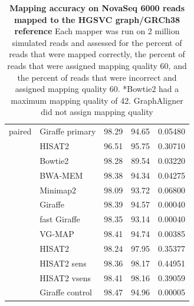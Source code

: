 \documentclass[11pt]{ucscthesis}
\begin{document}
\begin{table}[H]
\begin{tabular}{|l|l|r|r|r|}
        \hline
        paired  & Giraffe primary	& 98.29     & 94.65     & 0.05480 \\
                & HISAT2	        & 96.51     & 95.75     & 0.30710 \\
                & Bowtie2       	& 98.28     & 89.54     & 0.03220 \\
                & BWA-MEM       	& 98.38     & 94.34     & 0.04275 \\
                & Minimap2      	& 98.09     & 93.72     & 0.06800 \\
                & Giraffe       	& 98.39     & 94.57     & 0.00040 \\
                & fast Giraffe  	& 98.35     & 93.14     & 0.00040 \\
                & VG-MAP	        & 98.41     & 94.74     & 0.00385 \\
                & HISAT2	        & 98.24     & 97.95     & 0.35377 \\
                & HISAT2 sens   	& 98.36     & 98.17     & 0.44951 \\
                & HISAT2 vsens	    & 98.41     & 98.16     & 0.39059 \\
                & Giraffe control	& 98.47     & 94.96     & 0.00005 \\

        \hline
        
    \end{tabular}
    \caption[Mapping accuracy on NovaSeq 6000 reads mapped to the HGSVC graph/GRCh38 reference]{\textbf{Mapping accuracy on NovaSeq 6000 reads mapped to the HGSVC graph/GRCh38 reference} Each mapper was run on 2 million simulated reads and assessed for the percent of reads that were mapped correctly, the percent of reads that were assigned mapping quality 60, and the percent of reads that were incorrect and assigned mapping quality 60. *Bowtie2 had a maximum mapping quality of 42. GraphAligner did not assign mapping quality}
    \label{tab:mapping_accuracy_hgsvc_novaseq6000}
\end{table}
\end{document}
